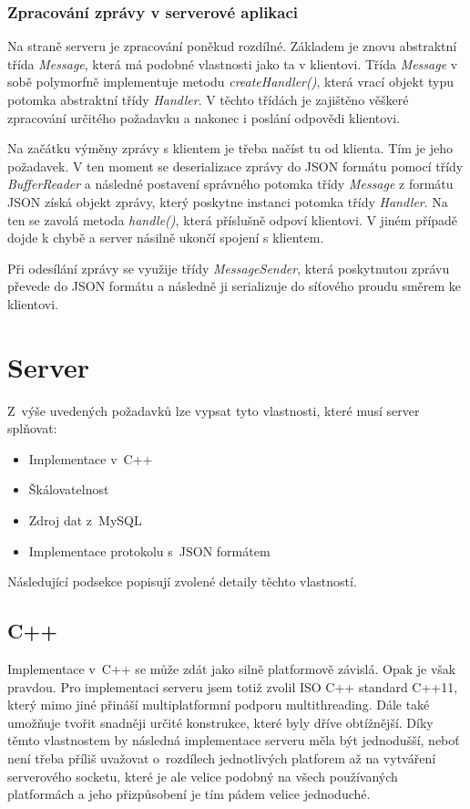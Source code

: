 \documentclass[thesis=B,czech]{FITthesis}[2013/10/20]
\begin{document}
\subsubsection{Zpracování zprávy v serverové aplikaci}

Na straně serveru je zpracování poněkud rozdílné. Základem je znovu abstraktní třída \textit{Message}, která má podobné vlastnosti jako ta v klientovi. Třída \textit{Message} v sobě polymorfně implementuje metodu \textit{createHandler()}, která vrací objekt typu potomka abstraktní třídy \textit{Handler}. V těchto třídách je zajištěno věškeré zpracování určitého požadavku a nakonec i poslání odpovědi klientovi.

Na začátku výměny zprávy s klientem je třeba načíst tu od klienta. Tím je jeho požadavek. V ten moment se deserializace zprávy do JSON formátu pomocí třídy \textit{BufferReader} a následné postavení správného potomka třídy \textit{Message} z formátu JSON získá objekt zprávy, který poskytne instanci potomka třídy \textit{Handler}. Na ten se zavolá metoda \textit{handle()}, která příslušně odpoví klientovi. V jiném případě dojde k chybě a server násilně ukončí spojení s klientem.

Při odesílání zprávy se využije třídy \textit{MessageSender}, která poskytnutou zprávu převede do JSON formátu a následně ji serializuje do síťového proudu směrem ke klientovi.

\section{Server}

Z~výše uvedených požadavků lze vypsat tyto vlastnosti, které musí server splňovat:

\begin{itemize}
  \item{Implementace v~C++}
  \item{Škálovatelnost}
  \item{Zdroj dat z~MySQL}
  \item{Implementace protokolu s~JSON formátem}
\end{itemize}

Následující podsekce popisují zvolené detaily těchto vlastností.

\subsection{C++}

Implementace v~C++ se může zdát jako silně platformově závislá. Opak je však pravdou. Pro implementaci serveru jsem totiž zvolil ISO C++ standard C++11, který mimo jiné přináší multiplatformní podporu multithreading. Dále také umožňuje tvořit snadněji určité konstrukce, které byly dříve obtížnější. Díky těmto vlastnostem by následná implementace serveru měla být jednodušší, neboť není třeba příliš uvažovat o~rozdílech jednotlivých platforem až na vytváření serverového socketu, které je ale velice podobný na všech používaných platformách a jeho přizpůsobení je tím pádem velice jednoduché.
\end{document}
